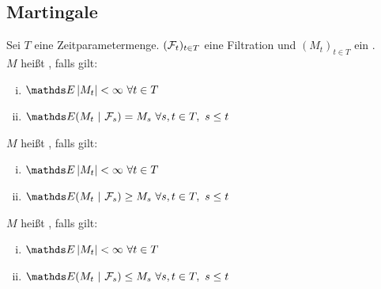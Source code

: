 \subsection{Martingale}
\label{sub:martingale}
Sei $T$ eine Zeitparametermenge. $(\mathcal{F}_t)_{t\in T}$ eine Filtration und $(M_t)_{t\in T}$ ein .\\
$M$ heißt , falls gilt:
\begin{enumerate}[(i)]
	\item $\E\abs{M_t}<\infty~\forall t\in T$
	\item $\E(M_t~|~\F_s)=M_s~\forall s,t\in T,~s\le t$
\end{enumerate}
$M$ heißt , falls gilt:
\begin{enumerate}[(i)]
	\item $\E\abs{M_t}<\infty~\forall t\in T$
	\item $\E(M_t~|~\F_s)\ge M_s~\forall s,t\in T,~s\le t$
\end{enumerate}
$M$ heißt , falls gilt:
\begin{enumerate}[(i)]
	\item $\E\abs{M_t}<\infty~\forall t\in T$
	\item $\E(M_t~|~\F_s)\le M_s~\forall s,t\in T,~s\le t$
\end{enumerate}

